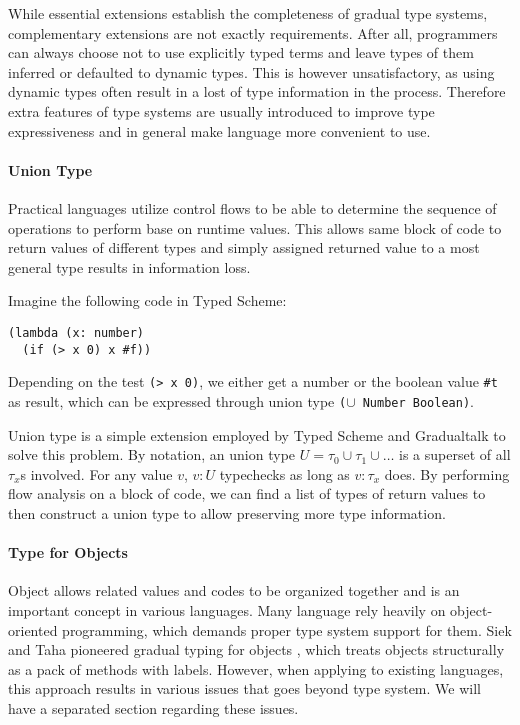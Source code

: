 While essential extensions establish the completeness of gradual type systems,
complementary extensions are not exactly requirements.
After all, programmers can always choose not to use explicitly typed terms and 
leave types of them inferred or defaulted to dynamic types.
This is however unsatisfactory, as using dynamic types often result in a lost of type information in the process.
Therefore extra features of type systems are usually introduced to improve type expressiveness and 
in general make language more convenient to use.

\paragraph{Union Type}

Practical languages utilize control flows to be able to determine
the sequence of operations to perform base on runtime values.
This allows same block of code to return values of different types and simply
assigned returned value to a most general type results in information loss.

Imagine the following code in Typed Scheme:

\begin{verbatim}
(lambda (x: number)
  (if (> x 0) x #f))
\end{verbatim}

Depending on the test \texttt{(> x 0)}, we either get a number or the boolean value \texttt{\#t} as result,
which can be expressed through union type \texttt{($\cup$ Number Boolean)}.

Union type is a simple extension employed by Typed Scheme and Gradualtalk
to solve this problem.
By notation, an union type $U = \tau_0 \cup \tau_1 \cup \ldots$ is a superset of
all $\tau_x$s involved. For any value $v$, $v : U$ typechecks as long as $v : \tau_x$ does.
By performing flow analysis on a block of code, we can find a list of types of return values to
then construct a union type to allow preserving more type information.

\paragraph{Type for Objects}

Object allows related values and codes to be organized together and is an important concept
in various languages. Many language rely heavily on object-oriented programming,
which demands proper type system support for them.
Siek and Taha pioneered gradual typing for objects \cite{siek2007gradual}, which
treats objects structurally as a pack of methods with labels.
However, when applying to existing languages,
this approach results in various issues that goes beyond type system.
We will have a separated section regarding these issues.

